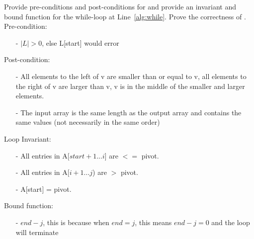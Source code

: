 \begin{problem}
\begin{questions}


    \item Provide pre-conditions and post-conditions for  and provide an invariant and bound function for the while-loop at Line~\ref*{alg:while}. Prove the correctness of .\\
Pre-condition:
\begin{enumerate}
    \item[-] $|L| > 0$, else L[start] would error
\end{enumerate}
Post-condition:
\begin{enumerate}
    \item[-] All elements to the left of v are smaller than or equal to v, all elements to the right of v are larger than v, v is in the middle of the smaller and larger elements.
    \item[-] The input array is the same length as the output array and contains the same values (not necessarily in the same order)
\end{enumerate}
Loop Invariant:
\begin{enumerate}
    \item[-] All entries in A[$start+1$...$i$] are $<=$ pivot.
    \item[-] All entries in A[$i + 1$...$j$) are $>$ pivot.
    \item[-] A[start] = pivot.
\end{enumerate}
Bound function:
\begin{enumerate}
    \item[-] $end-j$, this is because when $end = j$, this means $end-j=0$ and the loop will terminate
\end{enumerate}


\end{questions}
\end{problem}
